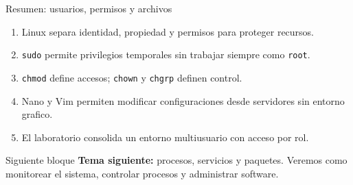 \documentclass[aspectratio=169]{beamer}
\begin{document}
\begin{frame}{Resumen: usuarios, permisos y archivos}
  \begin{enumerate}
    \item Linux separa identidad, propiedad y permisos para proteger recursos.
    \item \texttt{sudo} permite privilegios temporales sin trabajar siempre como \texttt{root}.
    \item \texttt{chmod} define accesos; \texttt{chown} y \texttt{chgrp} definen control.
    \item Nano y Vim permiten modificar configuraciones desde servidores sin entorno grafico.
    \item El laboratorio consolida un entorno multiusuario con acceso por rol.
  \end{enumerate}
  \vspace{0.25cm}
  \begin{alertblock}{Siguiente bloque}
    \textbf{Tema siguiente:} procesos, servicios y paquetes. Veremos como monitorear el sistema, controlar procesos y administrar software.
  \end{alertblock}
\end{frame}
\end{document}
